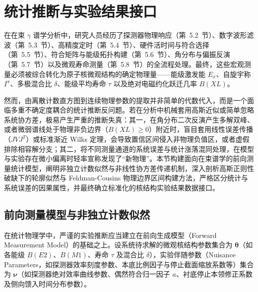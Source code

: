 \section{统计推断与实验结果接口}\label{sec:5-10}

在在束 $\gamma$ 谱学分析中，研究人员经历了探测器物理响应（第~5.2~节）、数字波形滤波（第~5.3~节）、高精度定时（第~5.4~节）、硬件活时间与符合选择（第~5.5~节）、符合矩阵与能级拓扑构建（第~5.6~节）、角分布与偏振反演（第~5.7~节）以及微观寿命测量（第~5.8~节）的全流程处理。最终，这些宏观测量必须被综合转化为原子核微观结构的确定物理量——能级激发能 $E_x$、自旋宇称 $I^\pi$、多极混合比 $\delta$、能级平均寿命 $\tau$ 以及绝对电磁约化跃迁几率 $B(XL)$。

然而，由离散计数直方图到连续物理参数的提取并非简单的代数代入，而是一个面临多重不确定度耦合的统计推断反问题。若在分析中机械套用高斯近似或简单忽略系统协方差，极易产生严重的推断失真：其一，在角分布二次反演产生多解双峰、或者微弱谱线处于物理非负边界（$B(XL) \ge 0$）附近时，盲目套用线性误差传播（$J V J^T$）或标准渐近 Wilks 定理，会导致置信区间侵入非物理负值区，或者虚假排除相容解分支；其二，将不同测量通道的系统误差与统计涨落混同处理，在模型与实验存在微小偏离时轻率宣称发现了“新物理”。本节构建面向在束谱学的前向测量统计模型，阐明非独立计数似然与非线性协方差传递机制，深入剖析高斯正则性破缺下的轮廓似然与 Feldman-Cousins 物理边界区间构建方法，严格区分统计与系统误差的因果属性，并最终确立标准化的核结构实验结果数据接口。

\subsection{前向测量模型与非独立计数似然}\label{subsec:5-10-1}

在统计物理学中，严谨的实验推断应当建立在前向生成模型（Forward Measurement Model）的基础之上。设系统待求解的微观核结构参数集合为 $\boldsymbol{\theta}$（如各能级 $B(E2)$、$B(M1)$、寿命 $\tau$ 及混合比 $\delta$），实验伴随参数（Nuisance Parameters，如探测器效率刻度参数、本底比例因子与停止截面缩放系数等）集合为 $\boldsymbol{\nu}$（如探测器绝对效率曲线参数、偶然符合归一因子 $a$、衬底停止本领修正系数及侧向馈入时间分布参数）。

